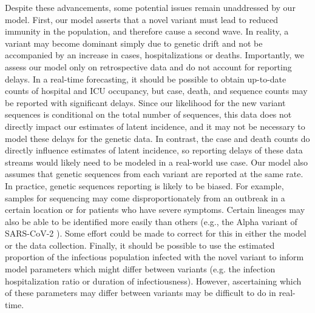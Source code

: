 Despite these advancements, some potential issues remain unaddressed by our model.
First, our model asserts that a novel variant must lead to reduced immunity in the population, and therefore cause a second wave.
In reality, a variant may become dominant simply due to genetic drift and not be accompanied by an increase in cases, hospitalizations or deaths.
Importantly, we assess our model only on retrospective data and do not account for reporting delays.
In a real-time forecasting, it should be possible to obtain up-to-date counts of hospital and ICU occupancy, but case, death, and sequence counts may be reported with significant delays.
Since our likelihood for the new variant sequences is conditional on the total number of sequences, this data does not directly impact our estimates of latent incidence, and it may not be necessary to model these delays for the genetic data.
In contrast, the case and death counts do directly influence estimates of latent incidence, so reporting delays of these data streams would likely need to be modeled in a real-world use case.
Our model also assumes that genetic sequences from each variant are reported at the same rate.
In practice, genetic sequences reporting is likely to be biased.
For example, samples for sequencing may come disproportionately from an outbreak in a certain location or for patients who have severe symptoms.
Certain lineages may also be able to be identified more easily than others (e.g., the Alpha variant of SARS-CoV-2 \citep{McMillen2022-ls}).
Some effort could be made to correct for this in either the model or the data collection.
Finally, it should be possible to use the estimated proportion of the infectious population infected with the novel variant to inform model parameters which might differ between variants (e.g. the infection hospitalization ratio or duration of infectiousness).
However, ascertaining which of these parameters may differ between variants may be difficult to do in real-time.





